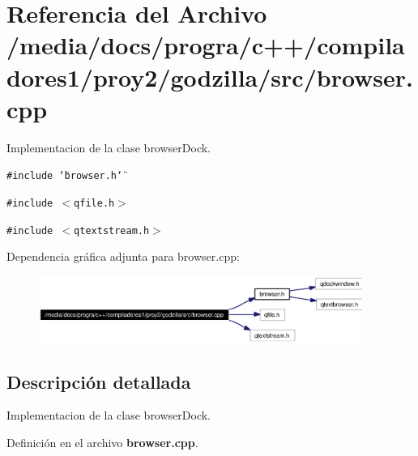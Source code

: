 \section{Referencia del Archivo /media/docs/progra/c++/compiladores1/proy2/godzilla/src/browser.cpp}
\label{browser_8cpp}
Implementacion de la clase browser\-Dock. 

{\tt \#include \char`\"{}browser.h\char`\"{}}\par
{\tt \#include $<$qfile.h$>$}\par
{\tt \#include $<$qtextstream.h$>$}\par


Dependencia gr\'{a}fica adjunta para browser.cpp:\begin{figure}[H]
\begin{center}
\leavevmode
\includegraphics[width=299pt]{browser_8cpp__incl}
\end{center}
\end{figure}


\subsection{Descripci\'{o}n detallada}
Implementacion de la clase browser\-Dock. 



Definici\'{o}n en el archivo {\bf browser.cpp}.